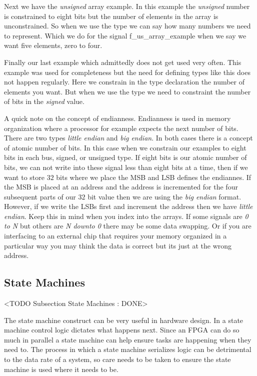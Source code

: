 Next we have the \emph{unsigned} array example. In this example the \emph{unsigned} number is constrained to eight bits but the number of elements in the array is unconstrained. So when we use the type we can say how many numbers we need to represent. Which we do for the signal f\_us\_array\_example when we say we want five elements, zero to four. 

Finally our last example which admittedly does not get used very often. This example was used for completeness but the need for defining types like this does not happen regularly. Here we constrain in the type declaration the number of elements you want. But when we use the type we need to constraint the number of bits in the \emph{signed} value. 

A quick note on the concept of endianness. Endianness is used in memory organization where a processor for example expects the next number of bits. There are two types \emph{little endian} and \emph{big endian}. In both cases there is a concept of atomic number of bits. In this case when we constrain our examples to eight bits in each bus, signed, or unsigned type. If eight bits is our atomic number of bits, we can not write into these signal less than eight bits at a time, then if we want to store $32$ bits where we place the \ac{MSB} and \ac{LSB} defines the endiannes. If the \ac{MSB} is placed at an address and the address is incremented for the four subsequent parts of our $32$ bit value then we are using the \emph{big endian} format. However, if we write the \ac{LSB}s first and increment the address then we have \emph{little endian}. Keep this in mind when you index into the arrays. If some signals are \emph{0 to N} but others are \emph{N downto 0} there may be some data swapping. Or if you are interfacing to an external chip that requires your memory organized in a particular way you may think the data is correct but its just at the wrong address.  
	

\subsection{State Machines}
	<TODO Subsection State Machines : DONE>

The state machine construct can be very useful in hardware design. In a state machine control logic dictates what happens next. Since an \ac{FPGA} can do so much in parallel a state machine can help ensure tasks are happening when they need to. The process in which a state machine serializes logic can be detrimental to the data rate of a system, so care needs to be taken to ensure the state machine is used where it needs to be. 

